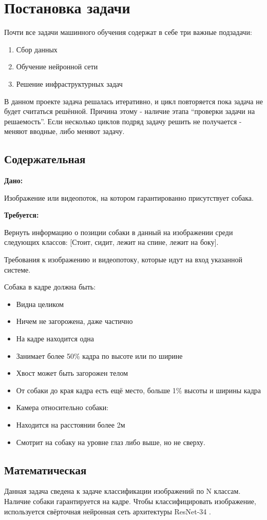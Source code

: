 \chapter{Постановка задачи} \label{chapt2}

Почти все задачи машинного обучения содержат в себе три важные подзадачи:
\begin{enumerate}
    \item Сбор данных
    \item Обучение нейронной сети
    \item Решение инфраструктурных задач
\end{enumerate}

В данном проекте задача решалась итеративно, и цикл повторяется пока задача не будет считаться решённой. Причина этому - наличие этапа “проверки задачи на решаемость”. Если несколько циклов подряд задачу решить не получается - меняют вводные, либо меняют задачу. 

\section{Содержательная} \label{sect2_1}
\textbf{Дано: } 

Изображение или видеопоток, на котором гарантированно присутствует собака.

\textbf{Требуется: } 

Вернуть информацию о позиции собаки в данный на изображении среди следующих классов: [Стоит, сидит, лежит на спине, лежит на боку].

Требования к изображению и видеопотоку, которые идут на вход указанной системе. 

Собака в кадре должна быть:
\begin{itemize}
    \item Видна целиком
    \item Ничем не загорожена, даже частично
    \item На кадре находится одна
    \item Занимает более 50\% кадра по высоте или по ширине
    \item Хвост может быть загорожен телом 
    \item От собаки до края кадра есть ещё место, больше 1\% высоты и ширины кадра
    \item Камера относительно собаки:
    \item Находится на расстоянии более 2м
    \item Смотрит на собаку на уровне глаз либо выше, но не сверху.
\end{itemize}

\section{Математическая} \label{sect2_2}
Данная задача сведена к задаче классификации изображений по N классам. Наличие собаки гарантируется на кадре. Чтобы классифицировать изображение, используется свёрточная нейронная сеть архитектуры ResNet-34 \cite{resnet}.